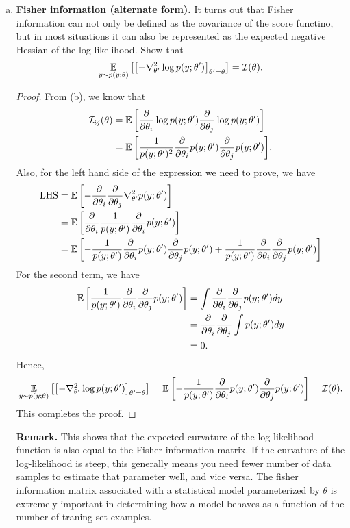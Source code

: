 \documentclass[12pt,letterpaper,boxed]{hmcpset}
\begin{document}
\begin{solution}
\begin{enumerate}[(a)]
  \item \textbf{Fisher information (alternate form).} It turns out that Fisher information can not only be defined as the covariance of the score functino, but in most situations it can also be represented as the expected negative Hessian of the log-likelihood. Show that
  \[
  \operatorname*{\mathbb{E}}_{y \sim p(y; \theta)} \qty[\qty[ - \nabla^2_{\theta'} \log p(y; \theta')]_{\theta' = \theta}] = \mathcal{I}(\theta).
  \]
  \begin{proof}
    From (b), we know that 
    \[
    \begin{aligned}
      \mathcal{I}_{ij}(\theta) &= \E \qty[\pderivative{\theta_i} \log p(y; \theta') \pderivative{\theta_j} \log p(y; \theta')] \\
      &= \E \qty[\frac{1}{p(y; \theta')^2} \pderivative{\theta_i}p(y; \theta') \pderivative{\theta_j} p(y; \theta')].
    \end{aligned}
    \]
    Also, for the left hand side of the expression we need to prove, we have
    \[
    \begin{aligned}
      \text{LHS} &= \E \qty[-\pderivative{\theta_i}\pderivative{\theta_j} \nabla^2_{\theta'} p(y; \theta')] \\
      &= \E \qty[\pderivative{\theta_i} \frac{1}{p(y; \theta')} \pderivative{\theta_i} p(y; \theta')] \\
      &= \E \qty[ -\frac{1}{p(y; \theta')}  \pderivative{\theta_i}p(y; \theta') \pderivative{\theta_j} p(y; \theta') + \frac{1}{p(y; \theta')} \pderivative{\theta_i} \pderivative{\theta_j}p(y; \theta')]
    \end{aligned}
    \]
    For the second term, we have
    \[
    \begin{aligned}
      \E \qty[\frac{1}{p(y; \theta')} \pderivative{\theta_i} \pderivative{\theta_j}p(y; \theta')] &= \int \pderivative{\theta_i} \pderivative{\theta_j} p(y; \theta') dy \\
      &= \pderivative{\theta_i} \pderivative{\theta_j} \int p(y; \theta') dy \\
      &= 0.
    \end{aligned}
    \]
    Hence, 
    \[
      \E_{y \sim p(y; \theta)} \qty[\qty[ - \nabla^2_{\theta'} \log p(y; \theta')]_{\theta' = \theta}] = \E \qty[ -\frac{1}{p(y; \theta')}  \pderivative{\theta_i}p(y; \theta') \pderivative{\theta_j} p(y; \theta')] = \mathcal{I}(\theta).
    \]
    This completes the proof.
  \end{proof}
  \begin{remark}
    \textbf{Remark.} This shows that the expected curvature of the log-likelihood function is also equal to the Fisher information matrix. If the curvature of the log-likelihood is steep, this generally means you need fewer number of data samples to estimate that parameter well, and vice versa. The fisher information matrix associated with a statistical model parameterized by $\theta$ is extremely important in determining how a model behaves as a function of the number of traning set examples.
  \end{remark}


\end{enumerate}
\end{solution}
\end{document}
